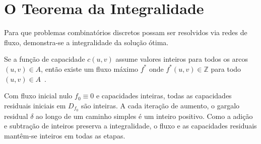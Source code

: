 \section{O Teorema da Integralidade}

Para que problemas combinatórios discretos possam ser resolvidos via redes de fluxo, demonstra-se a integralidade da solução ótima.

\begin{teorema}
Se a função de capacidade $c(u,v)$ assume valores inteiros para todos os arcos $(u,v) \in A$, então existe um fluxo máximo $f^*$ onde $f^*(u,v) \in \mathbb{Z}$ para todo $(u,v) \in A$~\cite{ford1956maximal}.
\end{teorema}

 Com fluxo inicial nulo $f_0 \equiv 0$ e capacidades inteiras, todas as capacidades residuais iniciais em $D_{f_0}$ são inteiras. A cada iteração de aumento, o gargalo residual $\delta$ ao longo de um caminho simples é um inteiro positivo. Como a adição e subtração de inteiros preserva a integralidade, o fluxo e as capacidades residuais mantêm-se inteiros em todas as etapas.

